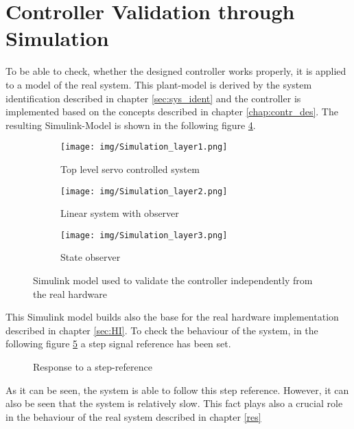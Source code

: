 \section{Controller Validation through Simulation}
\label{chap:sim}
To be able to check, whether the designed controller works properly, it is applied to a model of the real system. This plant-model is derived by the system identification described in chapter \ref{sec:sys_ident} and  the controller is implemented based on the concepts described in chapter \ref{chap:contr_des}. The resulting Simulink-Model is shown in the following figure \ref{fig:Simulink_sim_model}.

\begin{figure}[!h]
\centering
    \begin{subfigure}{\textwidth}
      \centering
      \texttt{[image: img/Simulation\_layer1.png]}
      \caption{Top level servo controlled system}
      \label{fig:simlayer1}
    \end{subfigure}
    \begin{subfigure}{\textwidth}
      \centering
      \texttt{[image: img/Simulation\_layer2.png]}
      \caption{Linear system with observer}
      \label{fig:simlayer2}
    \end{subfigure}
    \begin{subfigure}{\textwidth}
      \centering
      \texttt{[image: img/Simulation\_layer3.png]}
      \caption{State observer}
      \label{fig:simlayer1}
    \end{subfigure}    
    \caption[Simulink model used to validate the controller]{Simulink model used to validate the controller independently from the real hardware}
    \label{fig:Simulink_sim_model}
\end{figure}
\vspace{0.5cm}

This Simulink model builds also the base for the real hardware implementation described in chapter \ref{sec:HI}. 
To check the behaviour of the system, in the following figure \ref{fig:sim_res} a step signal reference has been set. 
\begin{figure}[!h]
        \centering
        
        \caption{Response to a step-reference}
        \label{fig:sim_res}
\end{figure}

As it can be seen, the system is able to follow this step reference. However, it can also be seen that the system is relatively slow. This fact plays also a crucial role in the behaviour of the real system described in chapter \ref{res} 

